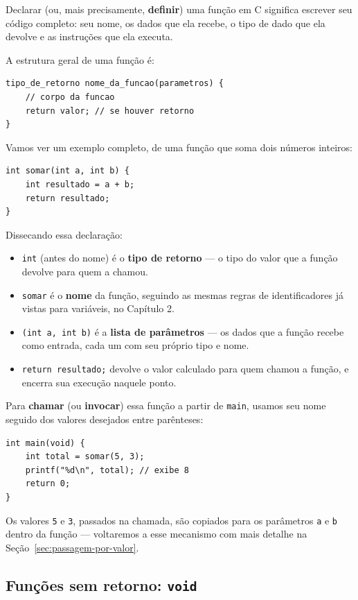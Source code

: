 \documentclass[12pt,a4paper,oneside]{extreport}
\begin{document}
Declarar (ou, mais precisamente, \textbf{definir}) uma função em C significa escrever seu código completo: seu nome, os dados que ela recebe, o tipo de dado que ela devolve e as instruções que ela executa.

A estrutura geral de uma função é:

\begin{lstlisting}
tipo_de_retorno nome_da_funcao(parametros) {
    // corpo da funcao
    return valor; // se houver retorno
}
\end{lstlisting}

Vamos ver um exemplo completo, de uma função que soma dois números inteiros:

\begin{lstlisting}
int somar(int a, int b) {
    int resultado = a + b;
    return resultado;
}
\end{lstlisting}

Dissecando essa declaração:

\begin{itemize}
    \item \texttt{int} (antes do nome) é o \textbf{tipo de retorno} — o tipo do valor que a função devolve para quem a chamou.
    \item \texttt{somar} é o \textbf{nome} da função, seguindo as mesmas regras de identificadores já vistas para variáveis, no Capítulo 2.
    \item \texttt{(int a, int b)} é a \textbf{lista de parâmetros} — os dados que a função recebe como entrada, cada um com seu próprio tipo e nome.
    \item \texttt{return resultado;} devolve o valor calculado para quem chamou a função, e encerra sua execução naquele ponto.
\end{itemize}

Para \textbf{chamar} (ou \textbf{invocar}) essa função a partir de \texttt{main}, usamos seu nome seguido dos valores desejados entre parênteses:

\begin{lstlisting}
int main(void) {
    int total = somar(5, 3);
    printf("%d\n", total); // exibe 8
    return 0;
}
\end{lstlisting}

Os valores \texttt{5} e \texttt{3}, passados na chamada, são copiados para os parâmetros \texttt{a} e \texttt{b} dentro da função — voltaremos a esse mecanismo com mais detalhe na Seção~\ref{sec:passagem-por-valor}.

\subsection{Funções sem retorno: \texttt{void}}
\end{document}
